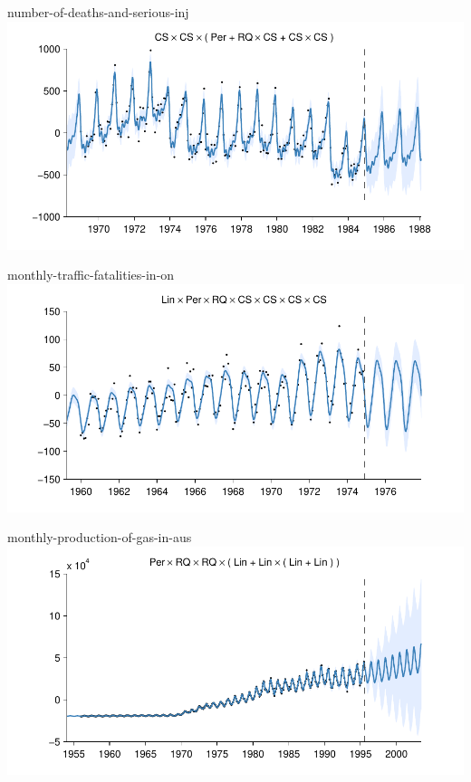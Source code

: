 \begin{frame}{number-of-deaths-and-serious-inj}
  \center
  \includegraphics[width=1.0\textwidth]{figures/number-of-deaths-and-serious-inj/number-of-deaths-and-serious-inj_all}
\end{frame}  

\begin{frame}{monthly-traffic-fatalities-in-on}
  \center
  \includegraphics[width=1.0\textwidth]{figures/monthly-traffic-fatalities-in-on/monthly-traffic-fatalities-in-on_all}
\end{frame}  

\begin{frame}{monthly-production-of-gas-in-aus}
  \center
  \includegraphics[width=1.0\textwidth]{figures/monthly-production-of-gas-in-aus/monthly-production-of-gas-in-aus_all}
\end{frame}  
    
